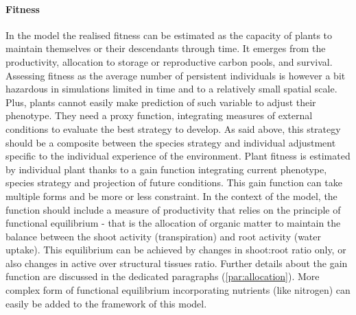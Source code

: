 \documentclass[a4paper,twoside, justified,marginals=raggedright]{tufte-handout}
\begin{document}
\paragraph{Fitness} 
In the model the realised fitness can be estimated as the capacity of plants to maintain themselves or their descendants through time. It emerges from the productivity, allocation to storage or reproductive carbon pools, and survival. Assessing fitness as the average number of persistent individuals is however a bit hazardous in simulations limited in time and to a relatively small spatial scale. Plus, plants cannot easily make prediction of such variable to adjust their phenotype. They need a proxy function, integrating measures of external conditions to evaluate the best strategy to develop. As said above, this strategy should be a composite between the species strategy and individual adjustment specific to the individual experience of the environment. Plant fitness is estimated by individual plant thanks to a gain function integrating current phenotype, species strategy and projection of future conditions. This gain function can take multiple forms and be more or less constraint. In the context of the model, the function should include a measure of productivity that relies on the principle of functional equilibrium - that is the allocation of organic matter to maintain the balance between the shoot activity (transpiration) and root activity (water uptake). This equilibrium can be achieved by changes in shoot:root ratio only, or also changes in active over structural tissues ratio. Further details about the gain function are discussed in the dedicated paragraphs (\ref{par:allocation}). More complex form of functional equilibrium incorporating nutrients (like nitrogen) can easily be added to the framework of this model.
\end{document}
